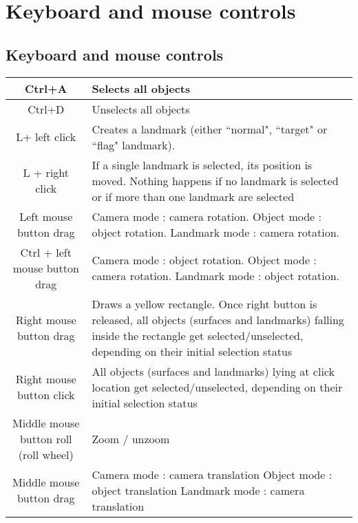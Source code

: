 \chapter{Keyboard and mouse controls}
\minitoc  

 \section{Keyboard and mouse controls}
\begin{tabularx}{\linewidth}{ | c | X | }
 \hline			
   Ctrl+A & Selects all objects \\ \hline				
   Ctrl+D & Unselects all objects \\ \hline				
   L+ left click & Creates a landmark (either ``normal", ``target" or ``flag" landmark). \\ \hline			
L + right click & If a single landmark is selected, its position is
moved. Nothing happens if no landmark is selected
or if more than one landmark are selected \\ \hline			

Left mouse button drag 
& Camera mode : camera rotation.\newline
 Object mode : object rotation.\newline
Landmark mode : camera rotation. \\ \hline			

Ctrl + left mouse button drag 
& Camera mode : object rotation.\newline
 Object mode : camera rotation.\newline
 Landmark mode : object rotation. \\ \hline	
		
Right mouse button drag & Draws a yellow rectangle. Once right button is
released, all objects (surfaces and landmarks)
falling inside the rectangle get selected/unselected,
depending on their initial selection status \\ \hline	
		
Right mouse button click & All objects (surfaces and landmarks) lying at click
location get selected/unselected, depending on
their initial selection status \\ \hline		
	
Middle mouse button roll (roll wheel) & Zoom / unzoom \\ \hline		
	
Middle mouse button drag 
& Camera mode : camera translation\newline
 Object mode : object translation\newline
 Landmark mode : camera translation \\ \hline	
		

\end{tabularx}
